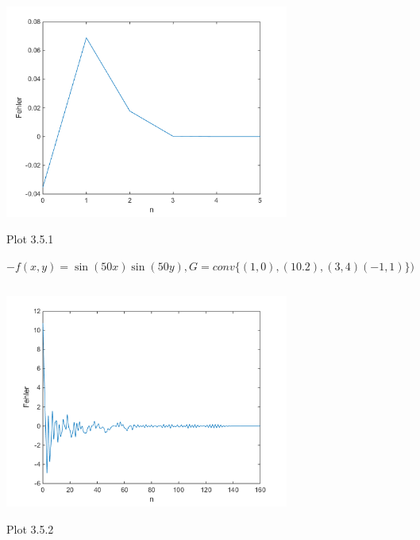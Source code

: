 \documentclass[a4paper,11pt,bibliography=totoc,listof=totoc,headinclude=true,cleardoublepage=empty,oneside]{scrbook}
\begin{document}
				\includegraphics[width=0.7\textwidth]{plot1.png} %
				\\
				\centerline{Plot 3.5.1}
			
				
				\color{change2}
			
				


\vspace{2.5cm}				
			\flushleft $-f(x,y)=\sin(50x)\sin(50y), G=conv\{(1,0),(10.2),(3,4)(-1,1)\})$
				
			
				
							
	\color{change}
	\lstset{ 
		language=Matlab, 
		showstringspaces=false}
	
	 
	\begin{lstlisting} 
	\end{lstlisting}
				
				
				
				
						\color{change2}
							\centering
							\includegraphics[width=0.7\textwidth]{plot2.png} \\
							\centerline{Plot 3.5.2}
					\hspace{0cm}		
							\label{fig:Bild1}
						
				
			
\end{document}
